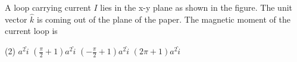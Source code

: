 
\item A loop carrying current \( I \) lies in the x-y plane as shown in the figure. The unit vector \( \hat{k} \) is coming out of the plane of the paper. The magnetic moment of the current loop is
    \begin{center}
    \end{center}
    \begin{tasks}(2)
        \task \( a^2 \hat{i} \)
        \task \( \left( \frac{\pi}{2} + 1 \right) a^2 \hat{i} \)
        \task \( \left( -\frac{\pi}{2} + 1 \right) a^2 \hat{i} \)
        \task \( (2\pi+1)a^2 \hat{i} \)
    \end{tasks}

